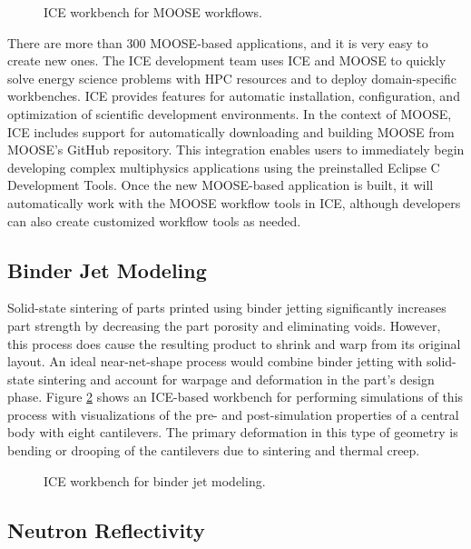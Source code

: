 \begin{figure}[htbp]
\centering
{}
\caption{ICE workbench for MOOSE workflows.}
\label{moose}
\end{figure}

There are more than 300 MOOSE-based applications, and it is very
easy to create new ones. The ICE development team uses ICE
and MOOSE to quickly solve energy science problems with HPC resources 
and to deploy domain-specific workbenches. ICE provides features for automatic installation, configuration, and optimization of scientific development environments. In the context of MOOSE, ICE includes support for automatically downloading and building MOOSE from MOOSE's GitHub
repository. This integration enables users to immediately begin developing
complex multiphysics applications using the preinstalled Eclipse C Development 
Tools. Once the new MOOSE-based application is built, it will automatically work with
the MOOSE workflow tools in ICE, although developers can also create
customized workflow tools as needed.

\subsection{Binder Jet Modeling}\label{binder-jet-modeling}

Solid-state sintering of parts printed using binder jetting
significantly increases part strength by decreasing the part porosity
and eliminating voids. However, this process does cause the resulting
product to shrink and warp from its original layout. An ideal near-net-shape 
process would combine binder jetting with solid-state sintering and account
for warpage and deformation in the part's design phase. 
Figure \ref{binder} shows an ICE-based workbench for performing simulations of
this process with visualizations of the pre- and post-simulation
properties of a central body with eight cantilevers. The primary
deformation in this type of geometry is bending or drooping of the
cantilevers due to sintering and thermal creep.

\begin{figure}[H]
\centering
{}
\caption{ICE workbench for binder jet modeling.}
\label{binder}
\end{figure}

\subsection{Neutron Reflectivity}\label{neutron-reflectivity}

